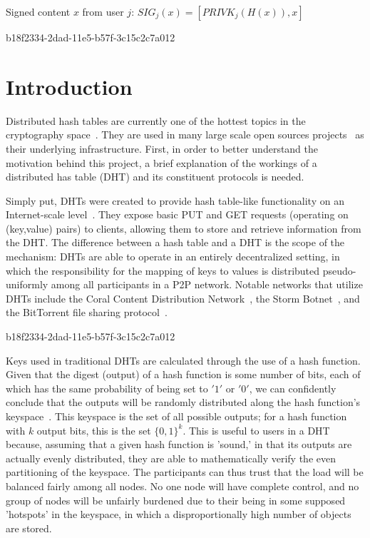 \documentclass[12pt]{article}
\begin{document}
Signed content $x$ from user $j$: $SIG_j(x) = \left[ PRIVK_j( H(x) ), x \right]$

b18f2334-2dad-11e5-b57f-3c15c2c7a012\section{Introduction}
\par Distributed hash tables are currently one of the hottest topics in the cryptography space~\cite{Stoica:2001dj,Rowstron:2001ea,Ratnasamy:2001wn}. They are used in many large scale open sources projects~\cite{Freitas:2013tb,Xu:2010vs,Perfitt:2010fh} as their underlying infrastructure. First, in order to better understand the motivation behind this project, a brief explanation of the workings of a distributed has table (DHT) and its constituent protocols is needed.

\par Simply put, DHTs were created to provide hash table-like functionality on an Internet-scale level~\cite{Ratnasamy:2001wn}. They expose basic PUT and GET requests (operating on (key,value) pairs) to clients, allowing them to store and retrieve information from the DHT. The difference between a hash table and a DHT is the scope of the mechanism: DHTs are able to operate in an entirely decentralized setting, in which the responsibility for the mapping of keys to values is distributed pseudo-uniformly among all participants in a P2P network. Notable networks that utilize DHTs include the Coral Content Distribution Network~\cite{Freedman:2004vb}, the Storm Botnet~\cite{Holz:2008uk}, and the BitTorrent file sharing protocol~\cite{Cohen:y1_8mBnw}.

b18f2334-2dad-11e5-b57f-3c15c2c7a012\par Keys used in traditional DHTs are calculated through the use of a hash function. Given that the digest (output) of a hash function is some number of bits, each of which has the same probability of being set to $'1'$ or $'0'$, we can confidently conclude that the outputs will be randomly distributed along the hash function's keyspace~. This keyspace is the set of all possible outputs; for a hash function with $k$ output bits, this is the set $\{0,1\}^k$. This is useful to users in a DHT because, assuming that a given hash function is 'sound,' in that its outputs are actually evenly distributed, they are able to mathematically verify the even partitioning of the keyspace. The participants can thus trust that the load will be balanced fairly among all nodes. No one node will have complete control, and no group of nodes will be unfairly burdened due to their being in some supposed 'hotspots' in the keyspace, in which a disproportionally high number of objects are stored.~
\end{document}
